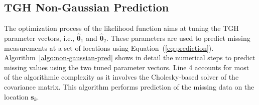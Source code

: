 \documentclass[conference]{IEEEtran}
\begin{document}
\subsection{TGH Non-Gaussian Prediction}
The optimization process of the likelihood function aims
at tuning the TGH parameter vectors, i.e., $\widehat{\bm{\theta}}_1$
 and $\widehat{\bm{\theta}}_2$. These parameters are used to
 predict missing measurements at a set of locations using 
 Equation~(\ref{eq:prediction}). Algorithm~\ref{algo:non-gaussian-pred} 
shows in detail the numerical steps to predict missing
 values using the two tuned parameter vectors. 
Line 4 accounts for most of the algorithmic complexity as it involves the Cholesky-based
solver of the covariance matrix. This algorithm performs prediction of the missing data
on the location $\bm{s}_k$.
\end{document}
